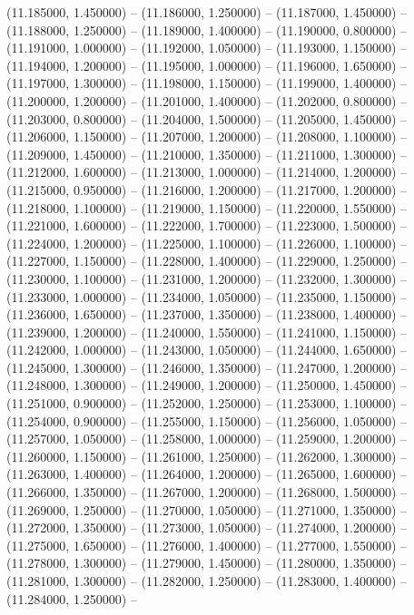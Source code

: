 (11.185000, 1.450000) -- 
(11.186000, 1.250000) -- 
(11.187000, 1.450000) -- 
(11.188000, 1.250000) -- 
(11.189000, 1.400000) -- 
(11.190000, 0.800000) -- 
(11.191000, 1.000000) -- 
(11.192000, 1.050000) -- 
(11.193000, 1.150000) -- 
(11.194000, 1.200000) -- 
(11.195000, 1.000000) -- 
(11.196000, 1.650000) -- 
(11.197000, 1.300000) -- 
(11.198000, 1.150000) -- 
(11.199000, 1.400000) -- 
(11.200000, 1.200000) -- 
(11.201000, 1.400000) -- 
(11.202000, 0.800000) -- 
(11.203000, 0.800000) -- 
(11.204000, 1.500000) -- 
(11.205000, 1.450000) -- 
(11.206000, 1.150000) -- 
(11.207000, 1.200000) -- 
(11.208000, 1.100000) -- 
(11.209000, 1.450000) -- 
(11.210000, 1.350000) -- 
(11.211000, 1.300000) -- 
(11.212000, 1.600000) -- 
(11.213000, 1.000000) -- 
(11.214000, 1.200000) -- 
(11.215000, 0.950000) -- 
(11.216000, 1.200000) -- 
(11.217000, 1.200000) -- 
(11.218000, 1.100000) -- 
(11.219000, 1.150000) -- 
(11.220000, 1.550000) -- 
(11.221000, 1.600000) -- 
(11.222000, 1.700000) -- 
(11.223000, 1.500000) -- 
(11.224000, 1.200000) -- 
(11.225000, 1.100000) -- 
(11.226000, 1.100000) -- 
(11.227000, 1.150000) -- 
(11.228000, 1.400000) -- 
(11.229000, 1.250000) -- 
(11.230000, 1.100000) -- 
(11.231000, 1.200000) -- 
(11.232000, 1.300000) -- 
(11.233000, 1.000000) -- 
(11.234000, 1.050000) -- 
(11.235000, 1.150000) -- 
(11.236000, 1.650000) -- 
(11.237000, 1.350000) -- 
(11.238000, 1.400000) -- 
(11.239000, 1.200000) -- 
(11.240000, 1.550000) -- 
(11.241000, 1.150000) -- 
(11.242000, 1.000000) -- 
(11.243000, 1.050000) -- 
(11.244000, 1.650000) -- 
(11.245000, 1.300000) -- 
(11.246000, 1.350000) -- 
(11.247000, 1.200000) -- 
(11.248000, 1.300000) -- 
(11.249000, 1.200000) -- 
(11.250000, 1.450000) -- 
(11.251000, 0.900000) -- 
(11.252000, 1.250000) -- 
(11.253000, 1.100000) -- 
(11.254000, 0.900000) -- 
(11.255000, 1.150000) -- 
(11.256000, 1.050000) -- 
(11.257000, 1.050000) -- 
(11.258000, 1.000000) -- 
(11.259000, 1.200000) -- 
(11.260000, 1.150000) -- 
(11.261000, 1.250000) -- 
(11.262000, 1.300000) -- 
(11.263000, 1.400000) -- 
(11.264000, 1.200000) -- 
(11.265000, 1.600000) -- 
(11.266000, 1.350000) -- 
(11.267000, 1.200000) -- 
(11.268000, 1.500000) -- 
(11.269000, 1.250000) -- 
(11.270000, 1.050000) -- 
(11.271000, 1.350000) -- 
(11.272000, 1.350000) -- 
(11.273000, 1.050000) -- 
(11.274000, 1.200000) -- 
(11.275000, 1.650000) -- 
(11.276000, 1.400000) -- 
(11.277000, 1.550000) -- 
(11.278000, 1.300000) -- 
(11.279000, 1.450000) -- 
(11.280000, 1.350000) -- 
(11.281000, 1.300000) -- 
(11.282000, 1.250000) -- 
(11.283000, 1.400000) -- 
(11.284000, 1.250000) -- 
